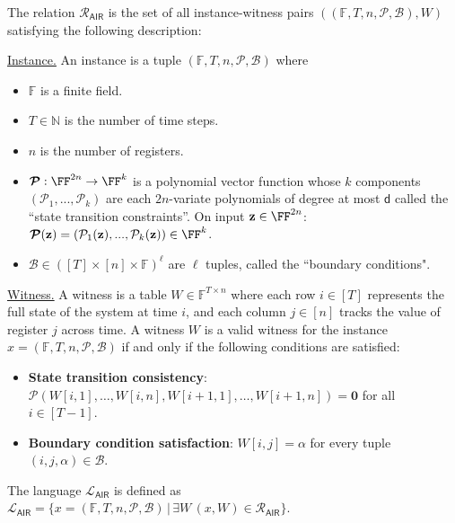 \begin{definition}
The relation $\mathcal{R}_\mathsf{AIR}$ is the set of all instance-witness pairs $((\mathbb{F}, T, n, \boldsymbol{\mathcal{P}}, \boldsymbol{\mathcal{B}}), W)$ satisfying the following description:

\noindent\underline{Instance.} An instance is a tuple $(\mathbb{F}, T, n, \boldsymbol{\mathcal{P}}, \boldsymbol{\mathcal{B}})$ where
\begin{itemize}\itemsep0pt
    \item $\mathbb{F}$ is a finite field.
    \item $T \in \mathbb{N}$ is the number of time steps.
    \item $n$ is the number of registers.
    \item $\boldsymbol{\mathcal{P}}: \FF^{2n} \rightarrow \FF^k$ %
    is a polynomial vector function whose $k$ components $(\mathcal{P}_1,...,\mathcal{P}_k)$ are each $2n$-variate polynomials of degree at most $\mathsf{d}$ called the ``state transition constraints''. On input $\mathbf{z} \in \FF^{2n}$: $\boldsymbol{\mathcal{P}}(\mathbf{z}) = (\mathcal{P}_1(\mathbf{z}),...,\mathcal{P}_k(\mathbf{z})) \in \FF^k$. 
    \item $\boldsymbol{\mathcal{B}} \in ([T] \times [n] \times \mathbb{F})^\ell$ are $\ell$ tuples, called the ``boundary conditions".
\end{itemize}

\noindent\underline{Witness.} A witness is a table $W \in \mathbb{F}^{T \times n}$ where each row $i \in [T]$ represents the full state of the system at time $i$, and each column $j \in [n]$ tracks the value of register $j$ across time. A witness $W$ is a valid witness for the instance $x = (\mathbb{F}, T, n, \boldsymbol{\mathcal{P}}, \boldsymbol{\mathcal{B}})$ if and only if the following conditions are satisfied:
\begin{itemize}\itemsep0pt
    \item \textbf{State transition consistency}: $\boldsymbol{\mathcal{P}}(W[i,1], \ldots, W[i,n], W[i+1, 1], \ldots, W[i+1,n]) = \boldsymbol{0}$ for all $i \in [T-1]$.
    \item \textbf{Boundary condition satisfaction}: $W[i,j] = \alpha$ for every tuple $(i, j, \alpha) \in \boldsymbol{\mathcal{B}}$.
\end{itemize}

The language $\mathcal{L}_\mathsf{AIR}$ is defined as $\mathcal{L}_\mathsf{AIR} = \{x=(\mathbb{F}, T, n, \boldsymbol{\mathcal{P}}, \boldsymbol{\mathcal{B}}) \, | \, \exists W \, (x,W) \in \mathcal{R}_\mathsf{AIR}\}$.
\end{definition}

